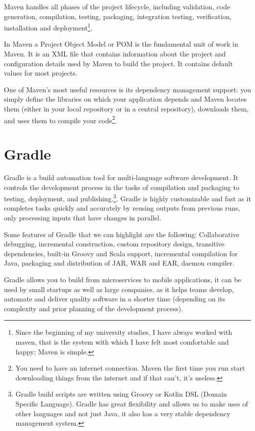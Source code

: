 \documentclass[a4paper,11pt]{article}
\begin{document}
Maven handles all phases of the project lifecycle, including validation, code
generation, compilation, testing, packaging, integration testing, verification,
installation and deployment\footnote{Since the beginning of my university studies,
I have always worked with maven, that is the system with which I have felt most
comfortable and happy; Maven is simple.}.

In Maven a Project Object Model or POM is the fundamental unit of work in Maven.
It is an XML file that contains information about the project and configuration
details used by Maven to build the project. It contains default values for most
projects\cite{Apache}.

One of Maven's most useful resources is its dependency management support: 
you simply define the libraries on which your application depends and Maven locates
them (either in your local repository or in a central repository), downloads them, and
uses them to compile your code\footnote{You need to have an internet connection. 
Maven the first time you run start downloading things from the internet and if that can't,
it's useless.}.

\section{Gradle}
Gradle is a build automation tool for multi-language software development. It controls the
development process in the tasks of compilation and packaging to testing, deployment, and
publishing\cite{Gradle}.\footnote{Gradle build scripts are written using Groovy or Kotlin DSL
(Domain Specific Language). Gradle has great flexibility and allows us to make uses of other
languages and not just Java, it also has a very stable dependency management system.}.
Gradle is highly customizable and fast as it completes tasks quickly and accurately by reusing
outputs from previous runs, only processing inputs that have changes in parallel.

Some features of Gradle that we can highlight are the following: Collaborative debugging,
incremental construction, custom repository design, transitive dependencies, built-in Groovy
and Scala support, incremental compilation for Java, packaging and distribution of JAR,
WAR and EAR, daemon compiler.

Gradle allows you to build from microservices to mobile applications, it can be used by small
startups as well as large companies, as it helps teams develop, automate and deliver quality
software in a shorter time (depending on its complexity and prior planning of the development
process)\cite{Gradle}.
\end{document}
